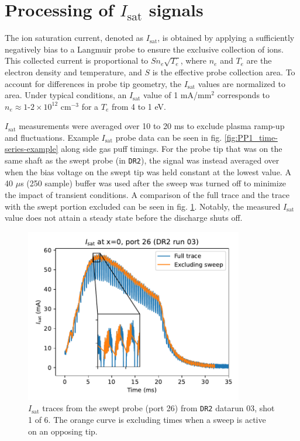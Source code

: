 \section{Processing of $I_\text{sat}$ signals}

The ion saturation current, denoted as $I_\text{sat}$, is obtained by applying a sufficiently negatively bias to a Langmuir probe to ensure the exclusive collection of ions. This collected current is proportional to $S n_e \sqrt{T_e}$, where $n_e$ and $T_e$ are the electron density and temperature, and $S$ is the effective probe collection area. To account for differences in probe tip geometry, the $I_\text{sat}$ values are normalized to area. Under typical conditions, an $I_\text{sat}$ value of 1 mA/mm$^2$ corresponds to $n_e \approx 1\text{-}2\times 10^{12}$ cm$^{-3}$ for a $T_e$ from 4 to 1 eV.

$I_\text{sat}$ measurements were averaged over 10 to 20 ms to exclude plasma ramp-up and fluctuations. Example $I_\text{sat}$ probe data can be seen in fig. \ref{fig:PP1_time-series-example} along side gas puff timings.  For the probe tip that was on the same shaft as the swept probe (in \texttt{DR2}), the signal was instead averaged over when the bias voltage on the swept tip was held constant at the lowest value. A 40 $\mu$s (250 sample) buffer was used after the sweep was turned off to minimize the impact of transient conditions. A comparison of the full trace and the trace with the swept portion excluded can be seen in fig. \ref{fig:PP1_swept_probe}. Notably, the measured $I_\text{sat}$ value does not attain a steady state before the discharge shuts off. 

\begin{figure}
	\centering
	\includegraphics[width=270pt]{figures/PP1_isat_swept_probe.pdf}
	\caption[size=12]{\label{fig:PP1_swept_probe}$I_\text{sat}$ traces from the swept probe (port 26) from \texttt{DR2} datarun 03, shot 1 of 6. The orange curve is excluding times when a sweep is active on an opposing tip. }
\end{figure}

